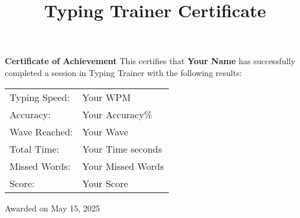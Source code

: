 \documentclass[a4paper,12pt]{article}
\title{Typing Trainer Certificate}
\author{}
\date{}
\begin{document}
\maketitle
\vspace{2cm}

\begin{center}
  \Large{\textbf{Certificate of Achievement}}
  \vspace{1cm}
  \normalsize{This certifies that}
  \vspace{0.5cm}
  \Large{\textbf{Your Name}}
  \vspace{0.5cm}
  \normalsize{has successfully completed a session in Typing Trainer with the following results:}
  \vspace{1cm}
  \begin{tabular}{ll}
    Typing Speed: & Your WPM \\
    Accuracy: & Your Accuracy\% \\
    Wave Reached: & Your Wave \\
    Total Time: & Your Time seconds \\
    Missed Words: & Your Missed Words \\
    Score: & Your Score \\
  \end{tabular}
  \vspace{2cm}
  \normalsize{Awarded on May 15, 2025}
\end{center}
\end{document}

